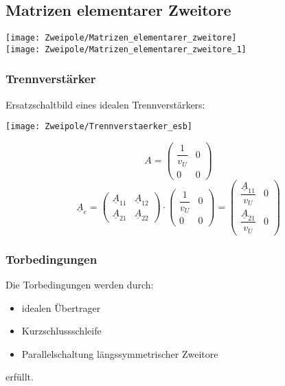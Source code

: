 \begin{samepage}
    \onecolumn
    \subsection{Matrizen elementarer Zweitore}
    \begin{center}
        \texttt{[image: Zweipole/Matrizen\_elementarer\_zweitore]}\\
        \texttt{[image: Zweipole/Matrizen\_elementarer\_zweitore\_1]}
    \end{center}
\end{samepage}
\twocolumn

\subsubsection{Trennverst\"arker}
\begin{mdframed}[style=exercise]
Ersatzschaltbild eines idealen Trennverst\"arkers:
    \begin{center}
        \texttt{[image: Zweipole/Trennverstaerker\_esb]}
    \end{center}
    \[
        A = \begin{pmatrix}
            \dfrac{1}{v_U} & 0 \\
                  0        & 0
        \end{pmatrix}
    \]
    \[
        \underline{A}_e = \begin{pmatrix}
            \underline{A}_{11} & \underline{A}_{12}\\
            \underline{A}_{21} & \underline{A}_{22}
        \end{pmatrix}
        \cdot
        \begin{pmatrix}
            \dfrac{1}{v_U} & 0 \\
                  0        & 0
        \end{pmatrix}
        = \begin{pmatrix}
            \dfrac{\underline{A}_{11}}{v_U} & 0\\
            \dfrac{\underline{A}_{21}}{v_U} & 0
        \end{pmatrix}
    \]
\end{mdframed}

\subsubsection{Torbedingungen}
Die Torbedingungen werden durch:
    \begin{itemize}
        \item idealen \"Ubertrager
        \item Kurzschlussschleife
        \item Parallelschaltung längssymmetrischer Zweitore
    \end{itemize} erf\"ullt.


